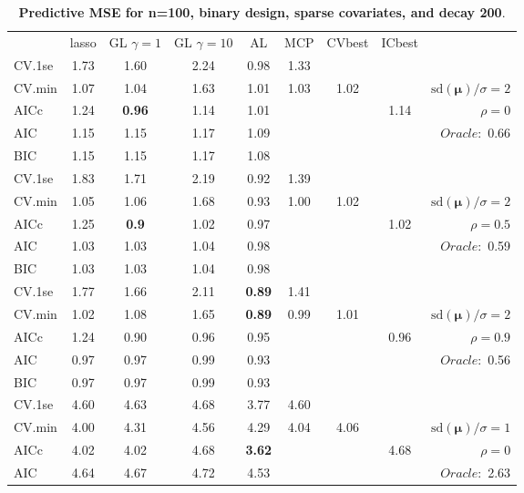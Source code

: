 \clearpage
\begin{table}\vspace{-.5cm}
\caption[l]{ { \bf Predictive MSE for n=100, binary design, 
sparse covariates, and  decay  200}.}
\vspace{-.5cm}
\footnotesize{}
\begin{center}
\begin{tabular}{l*{7}{c}|r}
 & lasso & GL $\gamma=1$ & GL $\gamma=10$ & AL & MCP  & CVbest & ICbest  \\
\cline{1-9}
CV.1se & 1.73 & 1.60 & 2.24 & 0.98 & 1.33 & & & \\
CV.min & 1.07 & 1.04 & 1.63 & 1.01 & 1.03 & 1.02 & & $\mathrm{sd}(\mathbf{\mu})/\sigma=2$ \\
AICc & 1.24 & {\bf 0.96} & 1.14 & 1.01 & & & 1.14 &  $\rho=0$ \\
AIC & 1.15 & 1.15 & 1.17 & 1.09 & & & &  \multirow{2}{*}{$Oracle: $ 0.66} \\
BIC & 1.15 & 1.15 & 1.17 & 1.08 & & & &  \\
 \hline 
CV.1se & 1.83 & 1.71 & 2.19 & 0.92 & 1.39 & & & \\
CV.min & 1.05 & 1.06 & 1.68 & 0.93 & 1.00 & 1.02 & & $\mathrm{sd}(\mathbf{\mu})/\sigma=2$ \\
AICc & 1.25 & {\bf 0.9} & 1.02 & 0.97 & & & 1.02 &  $\rho=0.5$ \\
AIC & 1.03 & 1.03 & 1.04 & 0.98 & & & &  \multirow{2}{*}{$Oracle: $ 0.59} \\
BIC & 1.03 & 1.03 & 1.04 & 0.98 & & & &  \\
 \hline 
CV.1se & 1.77 & 1.66 & 2.11 & {\bf 0.89} & 1.41 & & & \\
CV.min & 1.02 & 1.08 & 1.65 & {\bf 0.89} & 0.99 & 1.01 & & $\mathrm{sd}(\mathbf{\mu})/\sigma=2$ \\
AICc & 1.24 & 0.90 & 0.96 & 0.95 & & & 0.96 &  $\rho=0.9$ \\
AIC & 0.97 & 0.97 & 0.99 & 0.93 & & & &  \multirow{2}{*}{$Oracle: $ 0.56} \\
BIC & 0.97 & 0.97 & 0.99 & 0.93 & & & &  \\
 \hline 
CV.1se & 4.60 & 4.63 & 4.68 & 3.77 & 4.60 & & & \\
CV.min & 4.00 & 4.31 & 4.56 & 4.29 & 4.04 & 4.06 & & $\mathrm{sd}(\mathbf{\mu})/\sigma=1$ \\
AICc & 4.02 & 4.02 & 4.68 & {\bf 3.62} & & & 4.68 &  $\rho=0$ \\
AIC & 4.64 & 4.67 & 4.72 & 4.53 & & & &  \multirow{2}{*}{$Oracle: $ 2.63} \\

\end{tabular}
\end{center}
\end{table}
